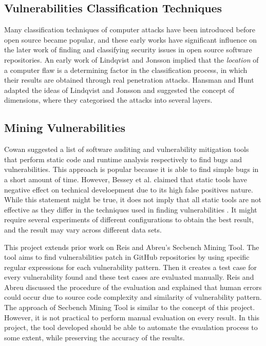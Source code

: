 \documentclass[12pt, a4paper]{report}
\begin{document}
{\subsection{Vulnerabilities Classification Techniques}
Many classification techniques of computer attacks have been introduced before open source became
popular, and these early works have significant influence on the later work of finding and
classifying security issues in open source software repositories. An early work of Lindqvist and
Jonsson \cite{lindqvist_1999} implied that the \textit{location} of a computer flaw is a determining
factor in the classification process, in which their results are obtained through real penetration
attacks. Hansman and Hunt \cite{hansman_2005} adapted the ideas of Lindqvist and Jonsson and
suggested the concept of dimensions, where they categorised the attacks into several layers.

\subsection{Mining Vulnerabilities}
Cowan \cite{cowan_2003} suggested a list of software auditing and vulnerability mitigation tools
that perform static code and runtime analysis respectively to find bugs and vulnerabilities. This
approach is popular because it is able to find simple bugs in a short amount of time. However,
Bessey et al. \cite{bessey_2010} claimed that static tools have negative effect on technical
develoepment due to its high false positives nature. While this statement might be true, it does not
imply that all static tools are not effective as they differ in the techniques used in finding
vulnerabilities \cite{moser_2008}. It might require several experiments of different configurations
to obtain the best result, and the result may vary across different data sets.

This project extends prior work on Reis and Abreu's \cite{secbench} Secbench Mining Tool. The tool
aims to find vulnerabilities patch in GitHub repositories by using specific regular expressions for
each vulnerability pattern. Then it creates a test case for every vulnerability found and these test
cases are evaluated manually. Reis and Abreu \cite{reis_2017} discussed the procedure of the
evaluation and explained that human errors could occur due to source code complexity and similarity
of vulnerability pattern. The approach of Secbench Mining Tool is similar to the concept of this
project. However, it is not practical to perform manual evaluation on every result. In this project,
the tool developed should be able to automate the evaulation process to some extent, while
preserving the accuracy of the results.

}
\end{document}
